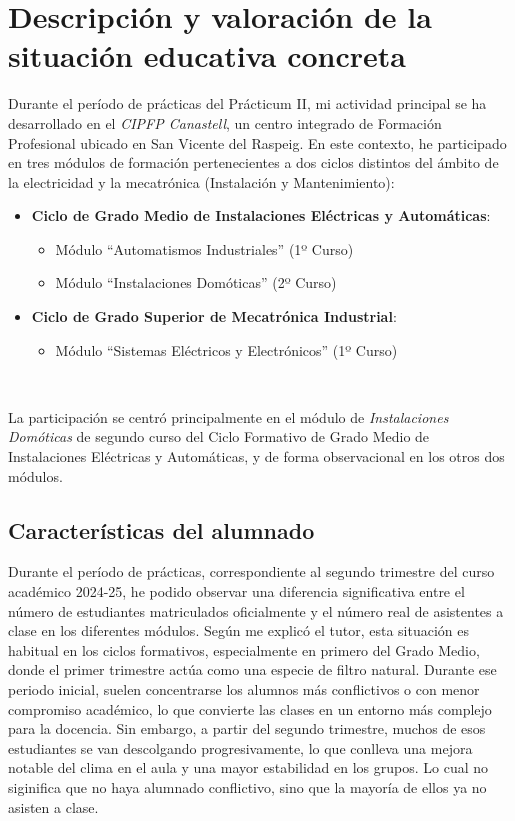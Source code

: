 \chapter{Descripción y valoración de la situación educativa concreta}

Durante el período de prácticas del Prácticum II, mi actividad principal se ha desarrollado en el \textit{CIPFP Canastell}, un centro integrado de Formación Profesional ubicado en San Vicente del Raspeig. En este contexto, he participado en tres módulos de formación pertenecientes a dos ciclos distintos del ámbito de la electricidad y la mecatrónica (Instalación y Mantenimiento):

\begin{itemize}
    \item \textbf{Ciclo de Grado Medio de Instalaciones Eléctricas y Automáticas}:
    \begin{itemize}
      \item Módulo ``Automatismos Industriales'' (1º Curso)
      \item Módulo ``Instalaciones Domóticas'' (2º Curso)
    \end{itemize}
    \item \textbf{Ciclo de Grado Superior de Mecatrónica Industrial}:
    \begin{itemize}
      \item Módulo ``Sistemas Eléctricos y Electrónicos'' (1º Curso)
    \end{itemize}
  \end{itemize}\

La participación se centró principalmente en el módulo de \textit{Instalaciones Domóticas} de segundo curso del Ciclo Formativo de Grado Medio de Instalaciones Eléctricas y Automáticas, y de forma observacional en los otros dos módulos.


\section{Características del alumnado}

Durante el período de prácticas, correspondiente al segundo trimestre del curso académico 2024-25, he podido observar una diferencia significativa entre el número de estudiantes matriculados oficialmente y el número real de asistentes a clase en los diferentes módulos. Según me explicó el tutor, esta situación es habitual en los ciclos formativos, especialmente en primero del Grado Medio, donde el primer trimestre actúa como una especie de filtro natural. Durante ese periodo inicial, suelen concentrarse los alumnos más conflictivos o con menor compromiso académico, lo que convierte las clases en un entorno más complejo para la docencia. Sin embargo, a partir del segundo trimestre, muchos de esos estudiantes se van descolgando progresivamente, lo que conlleva una mejora notable del clima en el aula y una mayor estabilidad en los grupos. Lo cual no siginifica que no haya alumnado conflictivo, sino que la mayoría de ellos ya no asisten a clase.

